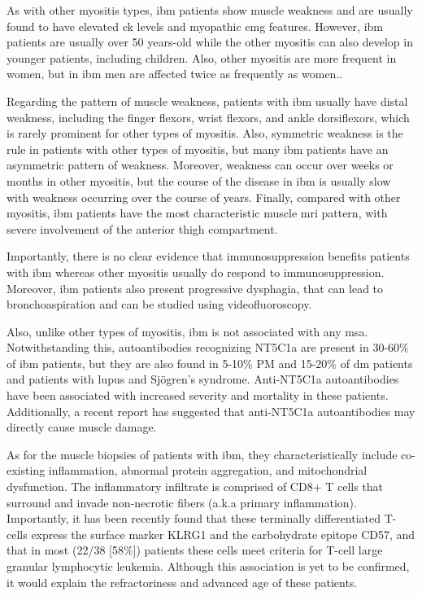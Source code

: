 As with other myositis types, \gls{ibm} patients show muscle weakness and are usually found to have elevated \gls{ck} levels and myopathic \gls{emg} features. However, \gls{ibm} patients are usually over 50 years-old while the other myositis can also develop in younger patients, including children.\cite{SelvaOCallaghan2018} Also, other myositis are more frequent in women, but in \gls{ibm} men are affected twice as frequently as women.\cite{SelvaOCallaghan2018}.

Regarding the pattern of muscle weakness, patients with \gls{ibm} usually have distal weakness, including the finger flexors, wrist flexors, and ankle dorsiflexors, which is rarely prominent for other types of myositis.\cite{Lloyd2014,SelvaOCallaghan2018} Also, symmetric weakness is the rule in patients with other types of myositis, but many \gls{ibm} patients have an asymmetric pattern of weakness.\cite{SelvaOCallaghan2018} Moreover, weakness can occur over weeks or months in other myositis, but the course of the disease in \gls{ibm} is usually slow with weakness occurring over the course of years.\cite{SelvaOCallaghan2018} Finally, compared with other myositis, \gls{ibm} patients have the most characteristic muscle \gls{mri} pattern, with severe involvement of the anterior thigh compartment.\cite{Tasca2015,PinalFernandez2017}

Importantly, there is no clear evidence that immunosuppression benefits patients with \gls{ibm} whereas other myositis usually do respond to immunosuppression.\cite{SelvaOCallaghan2018} Moreover, \gls{ibm} patients also present progressive dysphagia,\cite{SelvaOCallaghan2018} that can lead to bronchoaspiration and can be studied using videofluoroscopy. 

Also, unlike other types of myositis, \gls{ibm} is not associated with any \gls{msa}. Notwithstanding this, autoantibodies recognizing NT5C1a are present in 30-60\% of \gls{ibm} patients, but they are also found in 5-10\% PM and 15-20\% of \gls{dm} patients and patients with lupus and Sjögren's syndrome.\cite{Lloyd2016,Herbert2016,Muro2017,Lilleker2017} Anti-NT5C1a autoantibodies have been associated with increased severity and mortality in these patients.\cite{Lilleker2017,Goyal2016} Additionally, a recent report has suggested that anti-NT5C1a autoantibodies may directly cause muscle damage.\cite{Tawara2017}

As for the muscle biopsies of patients with \gls{ibm}, they characteristically include co-existing inflammation, abnormal protein aggregation, and mitochondrial dysfunction.\cite{Dalakas2002} The inflammatory infiltrate is comprised of CD8+ T cells that surround and invade non-necrotic fibers (a.k.a primary inflammation). Importantly, it has been recently found that these terminally differentiated T-cells express the surface marker KLRG1 and the carbohydrate epitope CD57, and that in most (22/38 [58\%]) patients these cells meet criteria for T-cell large granular lymphocytic leukemia.\cite{Greenberg2016,Greenberg2019} Although this association is yet to be confirmed, it would explain the refractoriness and advanced age of these patients.\cite{Greenberg2016,Greenberg2019,Greenberg2019a}

